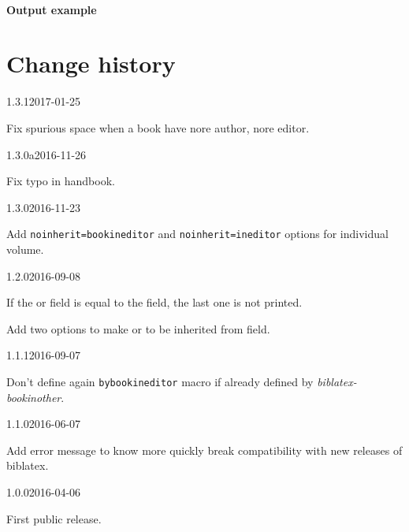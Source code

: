 \documentclass{ltxdockit}[2011/03/25]
\begin{document}
 
\paragraph{Output example}

\begin{quotation}
  \cite{BHG226a}
  
  \cite{BHG225a}
\end{quotation}
\section{Change history}
\begin{changelog}


\begin{release}{1.3.1}{2017-01-25}
  \item Fix spurious space when a book have nore author, nore editor.
\end{release}

\begin{release}{1.3.0a}{2016-11-26}
  \item Fix typo in handbook.
\end{release}

\begin{release}{1.3.0}{2016-11-23}
  \item Add \verb+noinherit=bookineditor+ and \verb+noinherit=ineditor+ options for individual volume.
\end{release}

\begin{release}{1.2.0}{2016-09-08}
  \item If the  or  field is equal to the field, the last one is not printed.
  \item Add two options to make  or  to be inherited from   field.
\end{release}

\begin{release}{1.1.1}{2016-09-07}
  \item Don't define again \verb+bybookineditor+ macro if already defined by \emph{biblatex-bookinother}.
\end{release}


\begin{release}{1.1.0}{2016-06-07}
  \item Add error message to know more quickly break compatibility with new releases of biblatex.
\end{release}

\begin{release}{1.0.0}{2016-04-06}
\item First public release.
\end{release}
\end{changelog}
\end{document}
